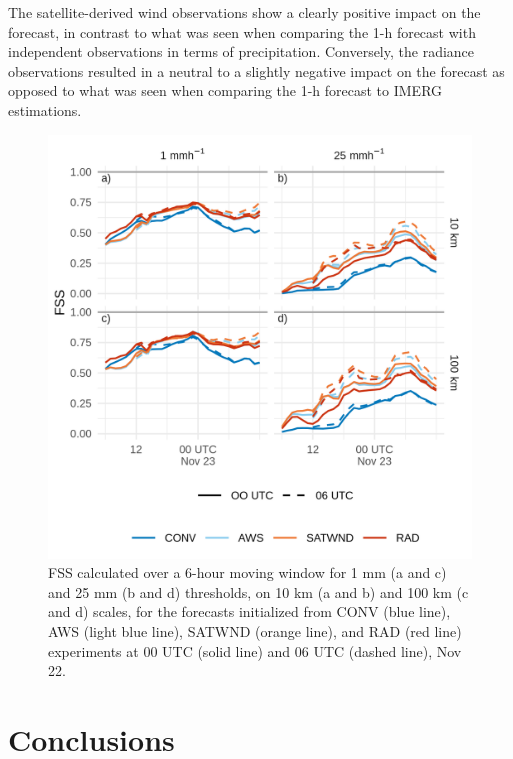 \documentclass[final,5p,times,twocolumn,authoryear]{elsarticle} %
\begin{document}
The satellite-derived wind observations show a clearly positive impact on the forecast, in contrast to what was seen when comparing the 1-h forecast with independent observations in terms of precipitation. Conversely, the radiance observations resulted in a neutral to a slightly negative impact on the forecast as opposed to what was seen when comparing the 1-h forecast to IMERG estimations.



\begin{figure}
\centering
\includegraphics{../figures/fssfcst-1.png}
\caption{\label{fig:fssfcst}FSS calculated over a 6-hour moving window for 1 mm (a and c) and 25 mm (b and d) thresholds, on 10 km (a and b) and 100 km (c and d) scales, for the forecasts initialized from CONV (blue line), AWS (light blue line), SATWND (orange line), and RAD (red line) experiments at 00 UTC (solid line) and 06 UTC (dashed line), Nov 22.}
\end{figure}

\hypertarget{conclusions}{%
\section{Conclusions}\label{conclusions}}
\end{document}
